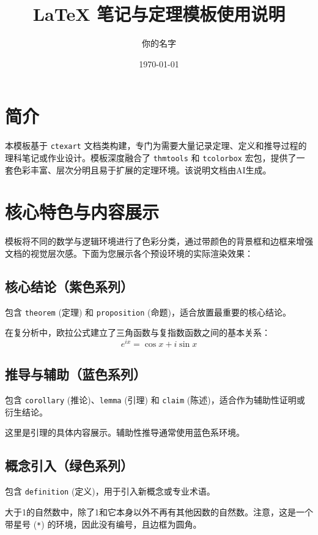 \documentclass[UTF8]{ctexart}
\title{LaTeX 笔记与定理模板使用说明}
\author{你的名字}
\date{\today}
\begin{document}
\maketitle

\section{简介}

本模板基于 \verb|ctexart| 文档类构建，专门为需要大量记录定理、定义和推导过程的理科笔记或作业设计。模板深度融合了 \verb|thmtools| 和 \verb|tcolorbox| 宏包，提供了一套色彩丰富、层次分明且易于扩展的定理环境。该说明文档由AI生成。

\section{核心特色与内容展示}

模板将不同的数学与逻辑环境进行了色彩分类，通过带颜色的背景框和边框来增强文档的视觉层次感。下面为您展示各个预设环境的实际渲染效果：

\subsection{核心结论（紫色系列）}
包含 \verb|theorem| (定理) 和 \verb|proposition| (命题)，适合放置最重要的核心结论。

\begin{theorem}[欧拉公式]
在复分析中，欧拉公式建立了三角函数与复指数函数之间的基本关系：
$$ e^{ix} = \cos x + i\sin x $$
\end{theorem}

\subsection{推导与辅助（蓝色系列）}
包含 \verb|corollary| (推论)、\verb|lemma| (引理) 和 \verb|claim| (陈述)，适合作为辅助性证明或衍生结论。

\begin{lemma}[辅助引理]
这里是引理的具体内容展示。辅助性推导通常使用蓝色系环境。
\end{lemma}

\subsection{概念引入（绿色系列）}
包含 \verb|definition| (定义)，用于引入新概念或专业术语。

\begin{definition*}[素数]
大于1的自然数中，除了1和它本身以外不再有其他因数的自然数。注意，这是一个带星号 (\verb|*|) 的环境，因此没有编号，且边框为圆角。
\end{definition*}
\end{document}
